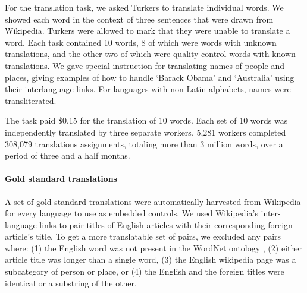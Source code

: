 \documentclass[11pt]{article}
\begin{document}
For the translation task, we asked Turkers to translate individual words.  We showed each word in the context of three sentences that were drawn from Wikipedia.  
Turkers were allowed to mark that they were unable to translate a word. Each task contained 10 words, 8 of which were words with unknown translations, and the other two of which were quality control words with known translations.   
We gave special instruction for translating names of people and places, giving examples of how to handle `Barack Obama' and `Australia' using their interlanguage links. For languages with non-Latin alphabets, names were transliterated. 

%
The task paid \$0.15 for the translation of 10 words.  
% 
Each set of 10 words was independently translated by three separate workers.  5,281 workers completed 308,079 translations assignments, totaling more than 3 million words, over a period of three and a half months.

\paragraph{Gold standard translations} 
A set of gold standard translations were automatically harvested from Wikipedia  for every language to use as embedded controls. We used Wikipedia's inter-language links to pair titles of English articles with their corresponding foreign article's title.  To get a more translatable set of pairs, we excluded any pairs where: (1) the English word was not present in the WordNet ontology  \cite{miller1995wordnet}, (2) either article title was longer than a single word, (3) the English wikipedia page was a subcategory of person or place, or (4) the English and the foreign titles were identical or a substring of the other.
\end{document}
